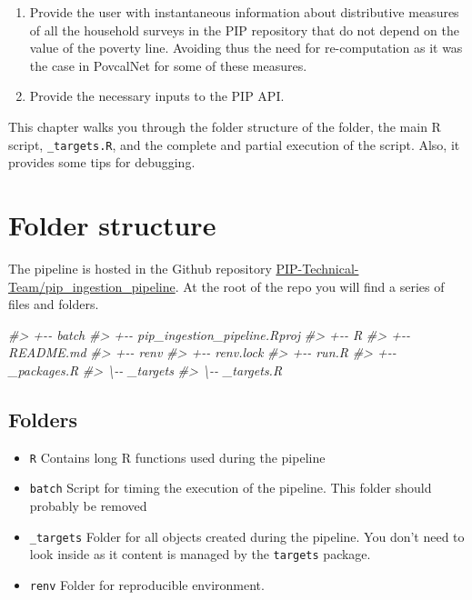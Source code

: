 \documentclass[
]{book}
\newenvironment{Shaded}{\begin{snugshade}}{\end{snugshade}}
\newcommand{\CommentTok}[1]{\textcolor[rgb]{0.56,0.35,0.01}{\textit{#1}}}
\providecommand{\tightlist}{%
  \setlength{\itemsep}{0pt}\setlength{\parskip}{0pt}}
\begin{document}
\begin{enumerate}
\def\labelenumi{\arabic{enumi}.}
\tightlist
\item
  Provide the user with instantaneous information about distributive measures
  of all the household surveys in the PIP repository that do not depend on the
  value of the poverty line. Avoiding thus the need for re-computation as it
  was the case in PovcalNet for some of these measures.
\item
  Provide the necessary inputs to the PIP API.
\end{enumerate}

This chapter walks you through the folder structure of the folder, the main R
script, \texttt{\_targets.R}, and the complete and partial execution of the script.
Also, it provides some tips for debugging.

\hypertarget{folder-structure}{%
\section{Folder structure}\label{folder-structure}}

The pipeline is hosted in the Github repository
\href{https://github.com/PIP-Technical-Team/pip_ingestion_pipeline}{PIP-Technical-Team/pip\_ingestion\_pipeline}.
At the root of the repo you will find a series of files and folders.

\begin{Shaded}
\begin{Highlighting}[]
\CommentTok{\#\textgreater{} +{-}{-} batch}
\CommentTok{\#\textgreater{} +{-}{-} pip\_ingestion\_pipeline.Rproj}
\CommentTok{\#\textgreater{} +{-}{-} R}
\CommentTok{\#\textgreater{} +{-}{-} README.md}
\CommentTok{\#\textgreater{} +{-}{-} renv}
\CommentTok{\#\textgreater{} +{-}{-} renv.lock}
\CommentTok{\#\textgreater{} +{-}{-} run.R}
\CommentTok{\#\textgreater{} +{-}{-} \_packages.R}
\CommentTok{\#\textgreater{} \textbackslash{}{-}{-} \_targets}
\CommentTok{\#\textgreater{} \textbackslash{}{-}{-} \_targets.R}
\end{Highlighting}
\end{Shaded}

\hypertarget{folders}{%
\subsection*{Folders}\label{folders}}

\begin{itemize}
\item
  \texttt{R} Contains long R functions used during the pipeline
\item
  \texttt{batch} Script for timing the execution of the pipeline. This folder should
  probably be removed
\item
  \texttt{\_targets} Folder for all objects created during the pipeline. You don't
  need to look inside as it content is managed by the \texttt{targets} package.
\item
  \texttt{renv} Folder for reproducible environment.
\end{itemize}
\end{document}
